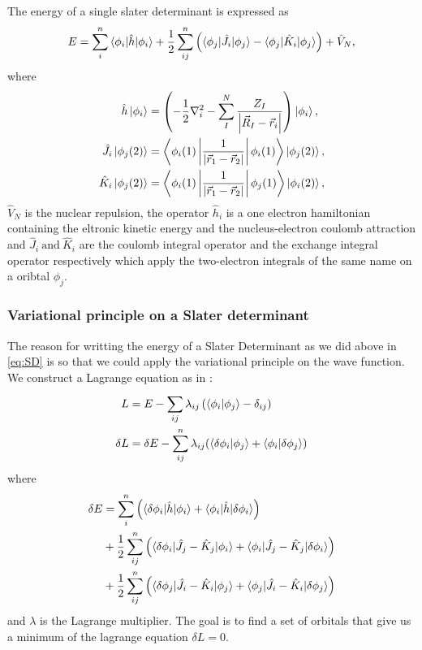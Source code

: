 \documentclass[../master_thesis.tex]{subfiles}
\begin{document}
The energy of a single slater determinant is expressed as
\begin{equation}
  E = \sumdef[n]{i} \braket{\phi_i|\hat{h}|\phi_i} + \frac{1}{2} \sumdef[n]{ij}\left(\braket{\phi_j|\hat{J}_{i}|\phi_j}
  - \braket{\phi_j|\hat{K}_{i}|\phi_j}\right) + \hat{V}_{N}\text{,}\label{eq:SD}
\end{equation}
where
\begin{align}
\hat{h}\ket{\phi_i} &= \left(-\frac{1}{2}\nabla^2_i - \sumdef[N]{I}\frac{Z_I}{\abs{\Rvec_I - \rvec_i}}\right)\ket{\phi_i},\\
\hat{J}_{i}\ket{\phi_j(2)} &= \left\langle\phi_i(1)\left|\frac{1}{\abs{\rvec_1 - \rvec_2}}\right|\phi_i(1)\right\rangle \ket{\phi_j(2)},\\
\hat{K}_{i}\ket{\phi_j(2)} &= \left\langle\phi_i(1)\left|\frac{1}{\abs{\rvec_1 - \rvec_2}}\right|\phi_j(1)\right\rangle\ket{\phi_i(2)},
\end{align}
$\hat{V}_N$ is the nuclear repulsion, the operator $\hat{h}_i$ is a one electron hamiltonian
containing the eltronic kinetic energy and the nucleus-electron coulomb attraction and
$\hat{J}_i\ \text{and}\ \hat{K}_i$ are the coulomb integral operator and the exchange integral operator
respectively \cite{Jensen:1999, Cramer:2004} which apply the two-electron integrals of the same name on a
oribtal $\phi_j$.

\subsubsection{Variational principle on a Slater determinant}

The reason for writting the energy of a Slater Determinant as we did above in \ref{eq:SD}
is so that we could apply the variational principle on the wave function. We
construct a Lagrange equation as in \cite{Jensen:1999}:
\begin{align}
  L &= E - \sumdef{ij}\lambda_{ij}\left(\braket{\phi_i|\phi_j} - \delta_{ij} \right) \\
  \delta L &= \delta E - \sumdef[n]{ij} \lambda_{ij}(\braket{\delta\phi_i|\phi_j} + \braket{\phi_i|\delta\phi_j})\label{eq:dlagrange}
\end{align}
where
\begin{align}\label{eq:dESD}
  \begin{split}
    \delta E &= \sumdef[n]{i}\left(\braket{\delta\phi_i|\hat{h}|\phi_i} + \braket{\phi_i|\hat{h}|\delta\phi_i}\right)\\
    &+ \frac{1}{2}\sumdef[n]{ij}\left(\braket{\delta\phi_i|\hat{J}_j - \hat{K}_j|\phi_i} + \braket{\phi_i|\hat{J}_j - \hat{K}_j|\delta\phi_i}\right)\\
    &+ \frac{1}{2}\sumdef[n]{ij}\left(\braket{\delta\phi_j|\hat{J}_i - \hat{K}_i|\phi_j} + \braket{\phi_j|\hat{J}_i - \hat{K}_i|\delta\phi_j}\right)
  \end{split}
\end{align}
and  $\lambda$ is the Lagrange multiplier.
The goal is to find a set of orbitals that give us a minimum of the lagrange
equation $\delta L = 0$.
\end{document}
